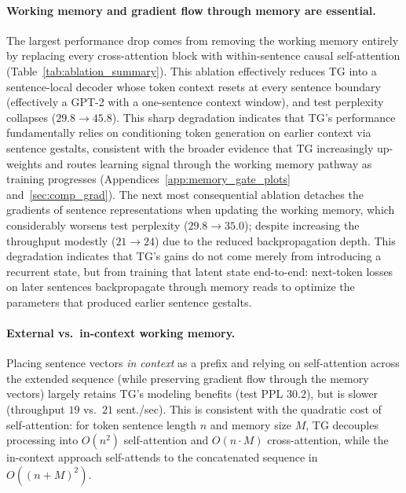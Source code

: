 \documentclass{article}
\begin{document}
\paragraph{Working memory and gradient flow through memory are essential.}
The largest performance drop comes from removing the working memory entirely by replacing every cross-attention block with within-sentence causal self-attention (Table~\ref{tab:ablation_summary}). This ablation effectively
reduces TG into a sentence-local decoder whose token context resets at every sentence boundary (effectively a GPT-2 with a one-sentence context window), and test perplexity collapses ($29.8 \rightarrow 45.8$). This sharp degradation indicates that TG’s performance fundamentally relies on conditioning token generation on earlier context via sentence gestalts, consistent with the broader evidence that TG increasingly up-weights and routes learning signal through the working memory pathway as training progresses (Appendices~\ref{app:memory_gate_plots} and~\ref{sec:comp_grad}). The next most consequential ablation detaches the gradients of sentence representations when updating the working memory, which considerably worsens test perplexity ($29.8 \rightarrow 35.0$); despite increasing the throughput modestly ($21 \rightarrow 24$) due to the reduced backpropagation depth. This degradation indicates that TG’s gains do not come merely from introducing a recurrent state, but from training that latent state end-to-end: next-token losses on later sentences backpropagate through memory reads to optimize the parameters that produced earlier sentence gestalts.



\paragraph{External vs.\ in-context working memory.}
Placing sentence vectors \emph{in context} as a prefix and relying on self-attention across the extended sequence (while preserving gradient flow through the memory vectors) largely retains TG’s modeling benefits (test PPL $30.2$), but is slower (throughput $19$ vs.\ $21$ sent./sec). 
This is consistent with the quadratic cost of self-attention: for token sentence length $n$ and memory size $M$, TG decouples processing into $O(n^2)$ self-attention and $O(n \cdot M)$ cross-attention, while the in-context approach self-attends to the concatenated sequence in $O((n+M)^2)$. 
\end{document}
